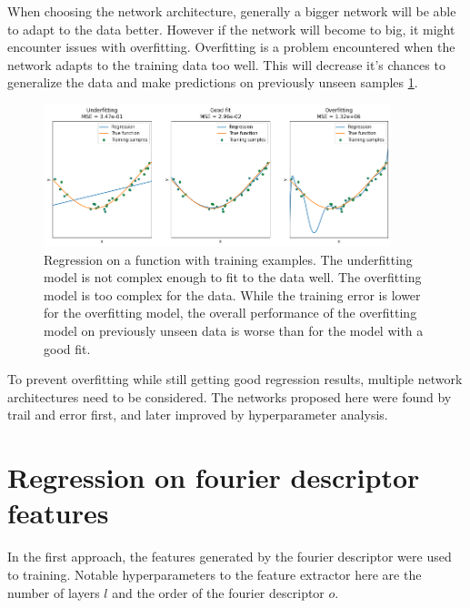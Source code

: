 When choosing the network architecture, generally a bigger network will be able to adapt to the data better.
However if the network will become to big, it might encounter issues with overfitting.
Overfitting is a problem encountered when the network adapts to the training data too well.
This will decrease it's chances to generalize the data and make predictions on previously unseen samples \ref{fig:overfitting}.

\begin{figure} [h]
    \centering
    \includegraphics[width=0.9\textwidth]{figures/regression/overfitting.png} 
    \caption{Regression on a function with training examples. 
            The underfitting model is not complex enough to fit to the data well. 
            The overfitting model is too complex for the data.
            While the training error is lower for the overfitting model, 
            the overall performance of the overfitting model on previously unseen data 
            is worse than for the model with a good fit.
        }
    \label{fig:overfitting}
\end{figure}
  
To prevent overfitting while still getting good regression results, multiple network architectures need to be considered.
The networks proposed here were found by trail and error first, and later improved by hyperparameter analysis.


\section{Regression on fourier descriptor features}
\label{sec:Evaluation:fourier}

In the first approach, the features generated by the fourier descriptor were used to training.
Notable hyperparameters to the feature extractor here are the number of layers $l$ and the order of the fourier descriptor $o$.

